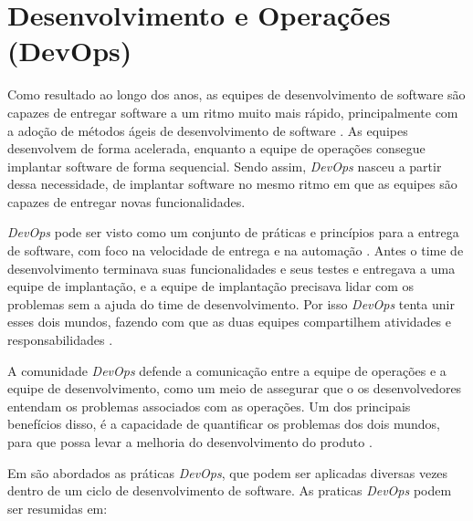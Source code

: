 \section{Desenvolvimento e Operações (DevOps)}
\label{subsec:DevOps}
Como resultado ao longo dos anos, as equipes de desenvolvimento de software
são capazes de entregar software a um ritmo muito mais rápido, principalmente com a adoção
de métodos ágeis de desenvolvimento de software \cite{7173368}. As 
equipes desenvolvem de forma acelerada, enquanto a equipe de operações consegue 
implantar software de forma sequencial. Sendo assim, \textit{DevOps}
nasceu a partir dessa necessidade, de implantar software no mesmo ritmo em que
as equipes são capazes de entregar novas funcionalidades.

\textit{DevOps} pode ser visto como um conjunto de práticas e princípios para a 
entrega de software, com foco na velocidade de entrega e na automação \cite{7173368}. 
Antes o time de desenvolvimento terminava suas funcionalidades e seus testes e
entregava a uma equipe de implantação, e a equipe de implantação precisava
lidar com os problemas sem a ajuda do time de desenvolvimento. Por isso \textit{DevOps} 
tenta unir esses dois mundos, fazendo com que as duas equipes compartilhem atividades
 e responsabilidades \cite{6265084}.

A comunidade \textit{DevOps} defende a comunicação
entre a equipe de operações e a equipe de desenvolvimento, como um meio de assegurar
que o os desenvolvedores entendam os problemas associados com as operações. Um dos
principais benefícios disso, é a capacidade de quantificar os problemas dos dois mundos,
para que possa levar a melhoria do desenvolvimento do produto \cite{httermann2012DevOps}.

Em  são abordados as práticas \textit{DevOps}, que podem ser 
aplicadas diversas vezes dentro de um ciclo de desenvolvimento de software. As 
praticas \textit{DevOps} podem ser resumidas em:

